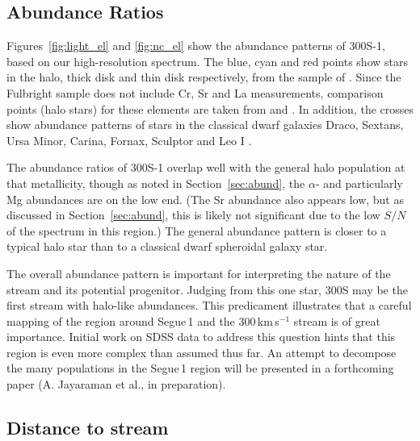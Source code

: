 \documentclass{emulateapj}
\begin{document}
\subsection{Abundance Ratios}
\label{sec:ab_rat}
Figures~\ref{fig:light_el} and \ref{fig:nc_el} show the abundance
patterns of 300S-1, based on our high-resolution spectrum. The
blue, cyan and red points show stars in the halo, thick disk and thin
disk respectively, from the sample of \citet{Fulbright2000,
  Fulbright2002}. Since the
Fulbright sample does not include Cr, Sr and La measurements,
comparison points (halo stars) for these elements are taken from
\citet{Lai2007} and \citet{Barklem2005}. In addition, the crosses show
abundance patterns of stars in the classical dwarf galaxies Draco,
Sextans, Ursa Minor, Carina, Fornax, Sculptor and Leo I
\citep{Shetrone2001, Shetrone2003, Geisler2005, Aoki2009, Cohen2009}.

The abundance ratios of 300S-1 overlap well with the general halo
population at that metallicity, though as noted in
Section~\ref{sec:abund}, the $\alpha$- and particularly Mg abundances
are on the low end. (The Sr abundance also appears low, but as
discussed in Section~\ref{sec:abund}, this is likely not significant
due to the low $S/N$ of the spectrum in this region.) The general
abundance pattern is closer to a typical halo star than to a
classical dwarf spheroidal galaxy star.


The overall abundance pattern is important for interpreting the nature
of the stream and its potential progenitor. Judging from this one
star, 300S may be the first stream with halo-like abundances. This
predicament illustrates that a careful mapping of the region around
Segue\,1 and the 300\,km\,s$^{-1}$ stream is of great
importance. Initial work on SDSS data to address this question hints
that this region is even more complex than assumed thus far. An
attempt to decompose the many populations in the Segue\,1 region will
be presented in a forthcoming paper (A. Jayaraman et al., in
preparation).



\subsection{Distance to stream}
\end{document}
